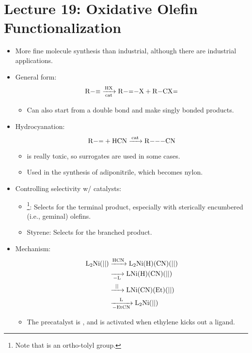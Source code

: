 \documentclass[../notes.tex]{subfiles}
\begin{document}
\section{Lecture 19: Oxidative Olefin Functionalization}
\begin{itemize}
    \item {}More fine molecule synthesis than industrial, although there are industrial applications.
    \item General form:
    \begin{equation*}
        \ce{R-# ->[HX][{cat}] R-=-X + R-CX=}
    \end{equation*}
    \begin{itemize}
        \item Can also start from a double bond and make singly bonded products.
    \end{itemize}
    \item Hydrocyanation:
    \begin{equation*}
        \ce{R-= + HCN ->[{cat}] R---CN}
    \end{equation*}
    \begin{itemize}
        \item {} is really toxic, so surrogates are used in some cases.
        \item Used in the synthesis of adiponitrile, which becomes nylon.
    \end{itemize}
    \item Controlling selectivity w/ catalysts:
    \begin{itemize}
        \item {}\footnote{Note that  is an ortho-tolyl group.}: Selects for the terminal product, especially with sterically encumbered (i.e., geminal) olefins.
        \item Styrene: Selects for the branched product.
    \end{itemize}
    \item Mechanism:
    \begin{align*}
        \ce{L_2Ni(||)} &\ce{->[HCN]} \ce{L_2Ni(H)(CN)(||)}\\
        &\ce{->[][-L]} \ce{LNi(H)(CN)(||)}\\
        &\ce{->[||]} \ce{LNi(CN)(Et)(||)}\\
        &\ce{->[L][-EtCN]} \ce{L2Ni(||)}
    \end{align*}
    \begin{itemize}
        \item The precatalyst is , and is activated when ethylene kicks out a ligand.

\end{itemize}
\end{itemize}
\end{document}
